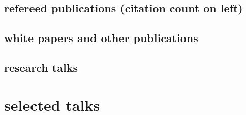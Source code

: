 \documentclass[]{luger-cv} %
\begin{document}
\ifdefined \withpubs
    \newpage
    \begin{changemargin}{-4.5cm}{0cm}
        \section{refereed publications {\footnotesize \normalfont (citation count on left)}}
    \end{changemargin}
\begin{changemargin}{-4.1cm}{0cm}
    \begin{list}{}{\pubslist}
        
    \end{list}
    \vspace{1em}
\end{changemargin}

\begin{changemargin}{-4.5cm}{0cm}
    \section{white papers and other publications}
\end{changemargin}
\begin{changemargin}{-4.1cm}{0cm}
    \begin{list}{}{\pubslist}
        
    \end{list}
    \vspace{1em}
\end{changemargin}
\fi
\begin{changemargin}{-4.5cm}{0cm}
\ifdefined \withtalks
    \section{research talks}
\end{changemargin}
\begin{changemargin}{-4.1cm}{0cm}
    \begin{list}{}{\pubslist}
        
    \end{list}
\fi
\end{changemargin}


\ifdefined \withselecttalks
    \vspace*{-0.7cm}
    \section{selected talks}
    \begin{list}{}{\pubslist}
        
    \end{list}
\fi
\end{document}

